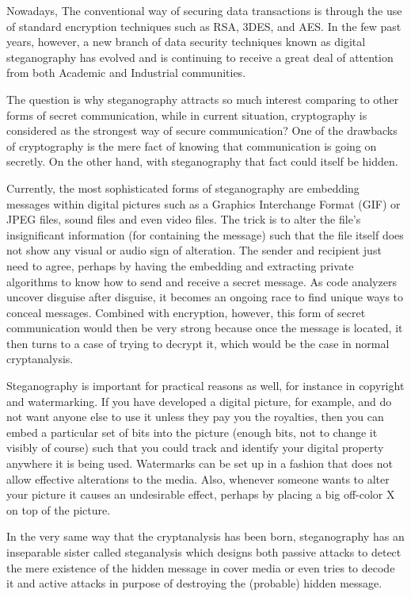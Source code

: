 Nowadays, The conventional way of securing data transactions is through the use of standard encryption techniques such as RSA, 3DES, and AES. In the few past years, however, a new branch of data security techniques known as digital steganography has evolved and is continuing to receive a great deal of attention from both Academic and Industrial communities.
        
 The question is why steganography attracts so much interest comparing to other forms of secret communication, while in current situation, cryptography is considered as the strongest way of secure communication? One of the drawbacks of cryptography is the mere fact of knowing that communication is going on secretly. On the other hand, with steganography that fact could itself be hidden.
        
 Currently, the most sophisticated forms of steganography are embedding messages within digital pictures such as a Graphics Interchange Format (GIF) or JPEG files, sound files and even video files. The trick is to alter the file's insignificant information (for containing the message) such that the file itself does not show any visual or audio sign of alteration. The sender and recipient just need to agree, perhaps by having the embedding and extracting private algorithms to know how to send and receive a secret message. As code analyzers uncover disguise after disguise, it becomes an ongoing race to find unique ways to conceal messages. Combined with encryption, however, this form of secret communication would then be very strong because once the message is located, it then turns to a case of trying to decrypt it, which would be the case in normal cryptanalysis.
        
 Steganography is important for practical reasons as well, for instance in copyright and watermarking. If you have developed a digital picture, for example, and do not want anyone else to use it unless they pay you the royalties, then you can embed a particular set of bits into the picture (enough bits, not to change it visibly of course) such that you could track and identify your digital property anywhere it is being used. Watermarks can be set up in a fashion that does not allow effective alterations to the media. Also, whenever someone wants to alter your picture it causes an undesirable effect, perhaps by placing a big off-color X on top of the picture.
        
 In the very same way that the cryptanalysis has been born, steganography has an inseparable sister called steganalysis which designs both passive attacks to detect the mere existence of the hidden message in cover media or even tries to decode it and active attacks in purpose of destroying the (probable) hidden message.
        
